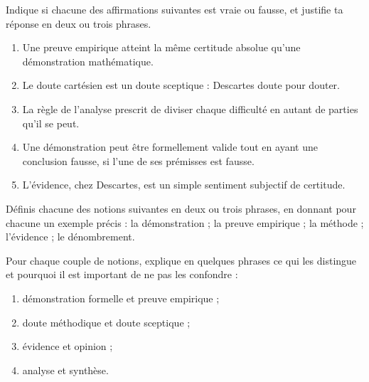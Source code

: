 \documentclass[11pt]{article}
\newcounter{popsec}
\newcounter{popsub}
\newcommand{\courssub}[1]{%
  \stepcounter{popsub}%
  \par\vspace{9pt}\noindent{\popxbold\fontsize{11.5}{13}\selectfont\color{popink}{\color{poporange}\thepopsec.\thepopsub}\hspace{6pt}#1}\par\nopagebreak\vspace{4pt}
}
\begin{document}
\begin{exercice}
Indique si chacune des affirmations suivantes est vraie ou fausse, et justifie ta réponse en deux ou trois phrases.
\begin{enumerate}
\item Une preuve empirique atteint la même certitude absolue qu'une démonstration mathématique.
\item Le doute cartésien est un doute sceptique : Descartes doute pour douter.
\item La règle de l'analyse prescrit de diviser chaque difficulté en autant de parties qu'il se peut.
\item Une démonstration peut être formellement valide tout en ayant une conclusion fausse, si l'une de ses prémisses est fausse.
\item L'évidence, chez Descartes, est un simple sentiment subjectif de certitude.
\end{enumerate}
\end{exercice}

\begin{exercice}[Définitions]
Définis chacune des notions suivantes en deux ou trois phrases, en donnant pour chacune un exemple précis : la démonstration ; la preuve empirique ; la méthode ; l'évidence ; le dénombrement.
\end{exercice}

\begin{exercice}
Pour chaque couple de notions, explique en quelques phrases ce qui les distingue et pourquoi il est important de ne pas les confondre :
\begin{enumerate}
\item démonstration formelle et preuve empirique ;
\item doute méthodique et doute sceptique ;
\item évidence et opinion ;
\item analyse et synthèse.
\end{enumerate}
\end{exercice}

\courssub{Je m'entraîne}
\end{document}
